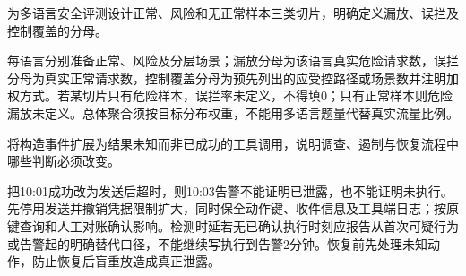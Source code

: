 \begin{exercises}
\begin{exercise} 为多语言安全评测设计正常、风险和无正常样本三类切片，明确定义漏放、误拦及控制覆盖的分母。

\begin{solution}
每语言分别准备正常、风险及分层场景；漏放分母为该语言真实危险请求数，误拦分母为真实正常请求数，控制覆盖分母为预先列出的应受控路径或场景数并注明加权方式。若某切片只有危险样本，误拦率未定义，不得填0；只有正常样本则危险漏放未定义。总体聚合须按目标分布权重，不能用多语言题量代替真实流量比例。
\end{solution}
\end{exercise}

\begin{exercise} 将构造事件扩展为结果未知而非已成功的工具调用，说明调查、遏制与恢复流程中哪些判断必须改变。

\begin{solution}
把10:01成功改为发送后超时，则10:03告警不能证明已泄露，也不能证明未执行。先停用发送并撤销凭据限制扩大，同时保全动作键、收件信息及工具端日志；按原键查询和人工对账确认影响。检测时延若无已确认执行时刻应报告从首次可疑行为或告警起的明确替代口径，不能继续写执行到告警2分钟。恢复前先处理未知动作，防止恢复后盲重放造成真正泄露。
\end{solution}
\end{exercise}

\end{exercises}
